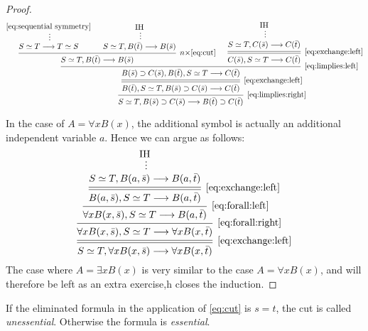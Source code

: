 \documentclass[11pt,a4paper]{article}
\begin{document}
\begin{proof}
    \begin{equation*}
        \begin{prooftree}
            \hypo{\eqref{eq:sequential symmetry}}
            \ellipsis{}{S\simeq{}T\seq T\simeq S}
            \hypo{\IH}
            \ellipsis{}{S\simeq T, B(\bar t)\seq B(\bar s)}
            \infer2[\(n\times\)\eqref{eq:cut}]{S\simeq T,B(\bar t)\seq B(\bar s)}
            \hypo{\IH}
            \ellipsis{}{S\simeq T,C(\bar s)\seq C(\bar t)}
            \infer[double]1[\eqref{eq:exchange:left}]{C(\bar s), S\simeq{}T\seq C(\bar t)}
            \infer2[\eqref{eq:limplies:left}]{B(\bar s)\limplies C(\bar s), B(\bar t),S\simeq{}T\seq C(\bar t)}
            \infer[double]1[\eqref{eq:exchange:left}]{B(\bar t),S\simeq T, B(\bar s)\limplies C(\bar s)\seq C(\bar t)}
            \infer1[\eqref{eq:limplies:right}]{S\simeq T, B(\bar s)\limplies C(\bar s)\seq B(\bar t)\limplies C(\bar t)}
        \end{prooftree}
    \end{equation*}

    In the case of \(A = \forall xB(x)\),
    the additional symbol is actually an additional
    independent variable \(a\). Hence we can argue as follows:
    \begin{equation*}
        \begin{prooftree}
            \hypo{\IH}
            \ellipsis{}{S\simeq T,B(a,\bar s)\seq B(a,\bar t)}
            \infer[double]1[\eqref{eq:exchange:left}]{B(a,\bar s),S\simeq{}T\seq B(a,\bar t)}
            \infer1[\eqref{eq:forall:left}]{\forall xB(x,\bar s),S\simeq{}T\seq B(a,\bar t)}
            \infer1[\eqref{eq:forall:right}]{\forall xB(x,\bar s),S\simeq{}T\seq\forall xB(x,\bar t)}
            \infer[double]1[\eqref{eq:exchange:left}]{S\simeq T, \forall xB(x,\bar s)\seq\forall xB(x,\bar t)}
        \end{prooftree}
    \end{equation*}
    The case where \(A = \exists xB(x)\) is very similar to the case \(A = \forall xB(x)\),
    and will therefore be left as an extra exercise,h closes the induction.
\end{proof}

\begin{definition}\label{def:essential formula}
    If the eliminated formula  in the application of \eqref{eq:cut}
    is \(s=t\), the cut is called \emph{unessential}.
    Otherwise the formula is \emph{essential}.
\end{definition}
\end{document}
